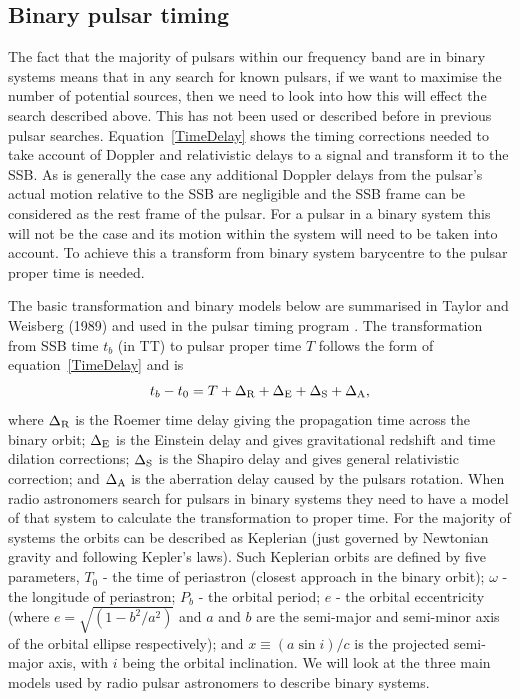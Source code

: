 \subsection{Binary pulsar timing}
The fact that the majority of pulsars within our \gw frequency band are in binary systems means
that in any search for known pulsars, if we want to maximise the number of potential sources, then
we need to look into how this will effect the search described above. This has not been used or
described before in previous pulsar \gw searches. Equation~\ref{TimeDelay} shows the timing
corrections needed to take account of Doppler and relativistic delays to a signal and transform
it to the SSB. As is generally the case any additional Doppler delays from the pulsar's actual
motion relative to the SSB are negligible and the SSB frame can be considered as the rest frame of
the pulsar. For a pulsar in a binary system this will not be the case and its motion within the
system will need to be taken into account. To achieve this a transform from binary
system barycentre to the pulsar proper time is needed.

The basic transformation and binary models below are summarised in Taylor and Weisberg (1989)
\cite{TaylorWeisberg:1989} and used in the pulsar timing program \tempo \cite{TEMPO}. The
transformation from SSB time $t_b$ (in TT) to pulsar proper time $T$ follows the form of 
equation~\ref{TimeDelay} and is
\begin{equation}\label{SSBtoPPT}
t_b - t_0 = T + \Delta_{\rm{R}} + \Delta_{\rm{E}} + \Delta_{\rm{S}} + \Delta_{\rm{A}},
\end{equation}
where $\Delta_{\rm{R}}$ is the Roemer time delay giving the propagation time across the binary
orbit; $\Delta_{\rm{E}}$ is the Einstein delay and gives gravitational redshift and time dilation
corrections; $\Delta_{\rm{S}}$ is the Shapiro delay and gives general relativistic correction; and
$\Delta_{\rm{A}}$ is the aberration delay caused by the pulsars rotation. When radio astronomers
search for pulsars in binary systems they need to have a model of that system to calculate the
transformation to proper time. For the majority of systems the orbits can be described as Keplerian
(just governed by Newtonian gravity and following Kepler's laws). Such Keplerian orbits are defined
by five parameters, $T_0$ - the time of periastron (closest approach in the binary orbit); $\omega$
- the longitude of periastron; $P_b$ - the orbital period; $e$ - the orbital eccentricity (where $e
= \sqrt{(1-b^2/a^2)}$ and $a$ and $b$ are the semi-major and semi-minor axis of the orbital ellipse
respectively); and $x \equiv (a\sin{i})/c$ is the projected semi-major axis, with $i$ being the
orbital inclination. We will look at the three main models used by radio pulsar astronomers to
describe binary systems.

